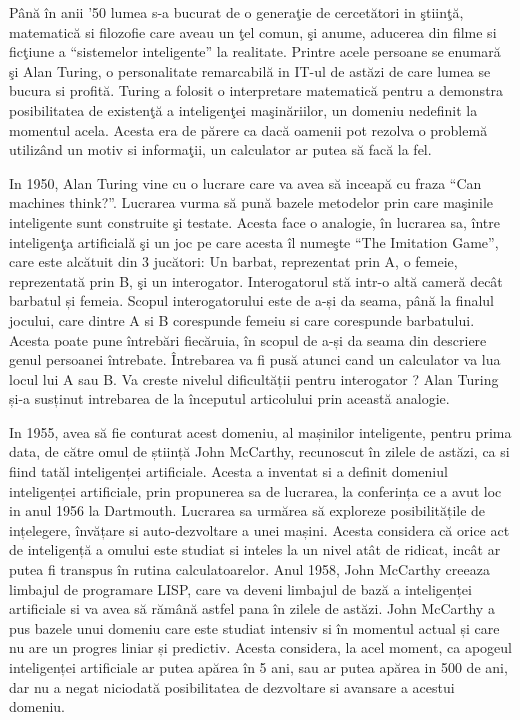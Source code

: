 	Până în anii '50 lumea s-a bucurat de o generaţie de cercetători in ştiinţă, matematică si filozofie care aveau un ţel comun, şi anume, aducerea din filme si ficţiune a “sistemelor inteligente” la realitate. Printre acele persoane se enumară şi Alan Turing, o personalitate remarcabilă in IT-ul de astăzi de care lumea se bucura si profită. Turing a folosit o interpretare matematică pentru a demonstra posibilitatea de existenţă a inteligenţei maşinăriilor, un domeniu nedefinit la momentul acela. Acesta era de părere ca dacă oamenii pot rezolva o problemă utilizând un motiv si informaţii, un calculator ar putea să facă la fel. \cite{ai_history}
	
	In 1950, Alan Turing vine cu o lucrare care va avea să inceapă cu fraza “Can machines think?”. Lucrarea vurma să pună bazele metodelor prin care maşinile inteligente sunt construite şi testate. Acesta face o analogie, în lucrarea sa, între inteligenţa artificială şi un joc pe care acesta îl numeşte “The Imitation Game”, care este alcătuit din 3 jucători: Un barbat, reprezentat prin A, o femeie, reprezentată prin B, şi un interogator. Interogatorul stă intr-o altă cameră decât barbatul și femeia. Scopul interogatorului este de a-și da seama, până la finalul jocului, care dintre A si B corespunde femeiu si care corespunde barbatului. Acesta poate pune întrebări fiecăruia, în scopul de a-și da seama din descriere genul persoanei întrebate. Întrebarea va fi pusă atunci cand un calculator va lua locul lui A sau B. Va creste nivelul dificultății pentru interogator ? Alan Turing și-a susținut intrebarea de la începutul  articolului prin această analogie. \cite{turing}
	
	In 1955, avea să fie conturat acest domeniu, al mașinilor inteligente, pentru prima data, de către omul de știință John McCarthy, recunoscut în zilele de astăzi, ca si fiind tatăl inteligenței artificiale. Acesta a inventat si a definit domeniul inteligenței artificiale, prin propunerea sa de lucrarea, la conferința ce a avut loc in anul 1956 la Dartmouth. Lucrarea sa urmărea să exploreze posibilitățile de ințelegere, învățare si auto-dezvoltare a unei mașini. Acesta considera că orice act de inteligență a omului este studiat si  inteles la un nivel atât de ridicat,  incât ar putea fi transpus în rutina calculatoarelor. Anul 1958, John McCarthy creeaza limbajul de programare LISP, care va deveni limbajul de bază a inteligenței artificiale si va avea să rămână astfel pana în zilele de astăzi. 
	John McCarthy a pus bazele unui domeniu care este studiat intensiv si în momentul actual și care nu are un progres liniar și predictiv. Acesta considera, la acel moment, ca apogeul inteligenței artificiale ar putea apărea în 5 ani, sau ar putea apărea in 500 de ani, dar nu a negat niciodată posibilitatea de dezvoltare si avansare a acestui domeniu. \cite{mccarthy_proposal}
	
